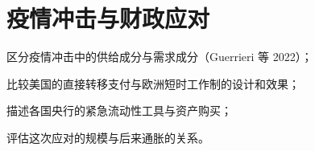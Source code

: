 \chapter{疫情冲击与财政应对}\label{ch:pandemic}

\begin{chapterguide}
\begin{guidegoals}
\item 区分疫情冲击中的供给成分与需求成分（Guerrieri 等 2022）；
\item 比较美国的直接转移支付与欧洲短时工作制的设计和效果；
\item 描述各国央行的紧急流动性工具与资产购买；
\item 评估这次应对的规模与后来通胀的关系。
\end{guidegoals}
\end{chapterguide}

\chapterstub
